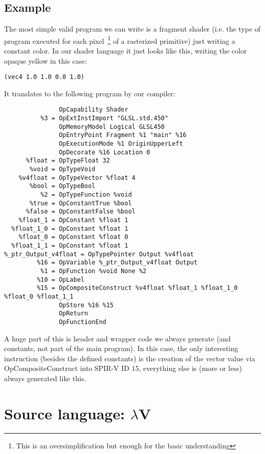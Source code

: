 \documentclass[letterpaper,12pt]{article}
\begin{document}
\subsection{Example}

The most simple valid program we can write is a fragment
shader (i.e. the type of program executed for each pixel~\footnote{This is
an oversimplification but enough for the basic understanding} of a
rasterized primitive) just writing a constant color.
In our shader language it just looks like this, writing the
color opaque yellow in this case:

\begin{lstlisting}
(vec4 1.0 1.0 0.0 1.0)
\end{lstlisting}

\noindent It translates to the following program by our compiler:

\begin{lstlisting}
               OpCapability Shader
          %3 = OpExtInstImport "GLSL.std.450"
               OpMemoryModel Logical GLSL450
               OpEntryPoint Fragment %1 "main" %16
               OpExecutionMode %1 OriginUpperLeft
               OpDecorate %16 Location 0
      %float = OpTypeFloat 32
       %void = OpTypeVoid
    %v4float = OpTypeVector %float 4
       %bool = OpTypeBool
          %2 = OpTypeFunction %void
       %true = OpConstantTrue %bool
      %false = OpConstantFalse %bool
    %float_1 = OpConstant %float 1
  %float_1_0 = OpConstant %float 1
    %float_0 = OpConstant %float 0
  %float_1_1 = OpConstant %float 1
%_ptr_Output_v4float = OpTypePointer Output %v4float
         %16 = OpVariable %_ptr_Output_v4float Output
          %1 = OpFunction %void None %2
         %10 = OpLabel
         %15 = OpCompositeConstruct %v4float %float_1 %float_1_0 %float_0 %float_1_1
               OpStore %16 %15
               OpReturn
               OpFunctionEnd
\end{lstlisting}

A huge part of this is header and wrapper code we always generate
(and constants, not part of the main program). In this case,
the only interesting instruction (besides the defined constants)
is the creation of the vector value via OpCompositeConstruct into
SPIR-V ID 15, everything else is (more or less) always generated like
this.

\section{Source language: $\lambda$V}
\end{document}
